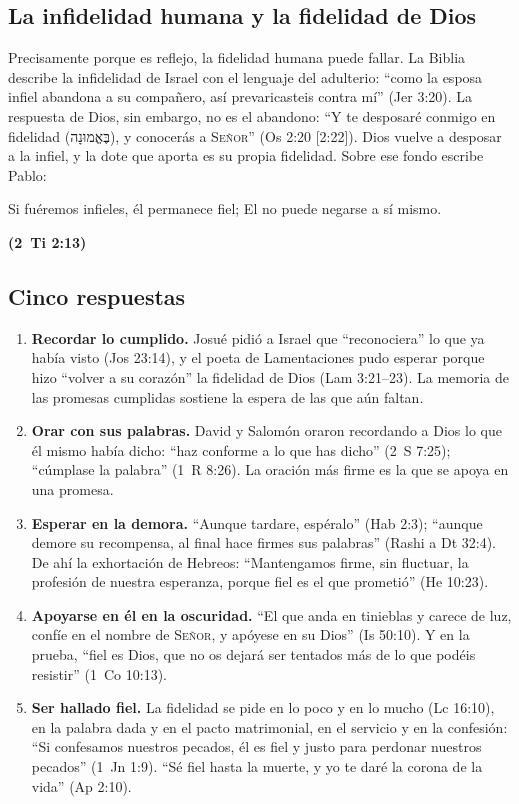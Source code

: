 \documentclass[11pt,letterpaper]{article}
\newcommand{\heb}[1]{\mbox{\foreignlanguage{hebrew}{#1}}}
\newcommand{\SENOR}{\textsc{Señor}}
\newcommand{\fuente}[1]{\par\hfill{\upshape\bfseries\small\textcolor{azul}{#1}}}
\begin{document}
\subsection{La infidelidad humana y la fidelidad de Dios}
Precisamente porque es reflejo, la fidelidad humana puede fallar. La Biblia describe la infidelidad de Israel con el lenguaje del adulterio: ``como la esposa infiel abandona a su compañero, así prevaricasteis contra mí'' (Jer 3:20). La respuesta de Dios, sin embargo, no es el abandono: ``Y te desposaré conmigo en fidelidad (\heb{בֶּאֱמוּנָה}), y conocerás a \SENOR'' (Os 2:20 [2:22]). Dios vuelve a desposar a la infiel, y la dote que aporta es su propia fidelidad. Sobre ese fondo escribe Pablo:

\begin{cita}Si fuéremos infieles, él permanece fiel; El no puede negarse a sí mismo.\fuente{(2~Ti 2:13)}\end{cita}

\subsection{Cinco respuestas}
\begin{enumerate}
\item \textbf{Recordar lo cumplido.} Josué pidió a Israel que ``reconociera'' lo que ya había visto (Jos 23:14), y el poeta de Lamentaciones pudo esperar porque hizo ``volver a su corazón'' la fidelidad de Dios (Lam 3:21--23). La memoria de las promesas cumplidas sostiene la espera de las que aún faltan.
\item \textbf{Orar con sus palabras.} David y Salomón oraron recordando a Dios lo que él mismo había dicho: ``haz conforme a lo que has dicho'' (2~S 7:25); ``cúmplase la palabra'' (1~R 8:26). La oración más firme es la que se apoya en una promesa.
\item \textbf{Esperar en la demora.} ``Aunque tardare, espéralo'' (Hab 2:3); ``aunque demore su recompensa, al final hace firmes sus palabras'' (Rashi a Dt 32:4). De ahí la exhortación de Hebreos: ``Mantengamos firme, sin fluctuar, la profesión de nuestra esperanza, porque fiel es el que prometió'' (He 10:23).
\item \textbf{Apoyarse en él en la oscuridad.} ``El que anda en tinieblas y carece de luz, confíe en el nombre de \SENOR, y apóyese en su Dios'' (Is 50:10). Y en la prueba, ``fiel es Dios, que no os dejará ser tentados más de lo que podéis resistir'' (1~Co 10:13).
\item \textbf{Ser hallado fiel.} La fidelidad se pide en lo poco y en lo mucho (Lc 16:10), en la palabra dada y en el pacto matrimonial, en el servicio y en la confesión: ``Si confesamos nuestros pecados, él es fiel y justo para perdonar nuestros pecados'' (1~Jn 1:9). ``Sé fiel hasta la muerte, y yo te daré la corona de la vida'' (Ap 2:10).
\end{enumerate}
\end{document}
